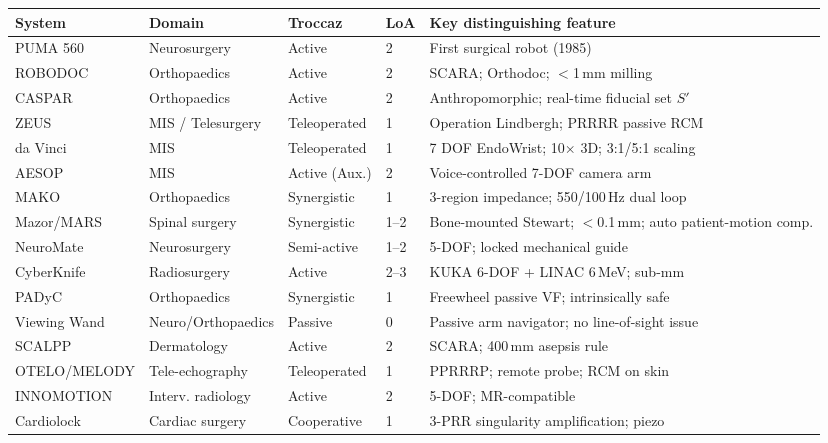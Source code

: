 \documentclass[11pt,a4paper,twoside]{report}
\begin{document}
\begin{table}[ht]
\centering\small
\begin{tabularx}{\textwidth}{@{}lXllX@{}}
\toprule
\textbf{System} & \textbf{Domain} & \textbf{Troccaz} & \textbf{LoA} & \textbf{Key distinguishing feature} \\
\midrule
PUMA 560        & Neurosurgery       & Active        & 2     & First surgical robot (1985) \\
ROBODOC         & Orthopaedics       & Active        & 2     & SCARA; Orthodoc; $<$1\,mm milling \\
CASPAR          & Orthopaedics       & Active        & 2     & Anthropomorphic; real-time fiducial set $S'$ \\
ZEUS            & MIS / Telesurgery  & Teleoperated  & 1     & Operation Lindbergh; PRRRR passive RCM \\
da Vinci        & MIS                & Teleoperated  & 1     & 7 DOF EndoWrist; 10$\times$ 3D; 3:1/5:1 scaling \\
AESOP           & MIS                & Active (Aux.) & 2     & Voice-controlled 7-DOF camera arm \\
MAKO            & Orthopaedics       & Synergistic   & 1     & 3-region impedance; 550/100\,Hz dual loop \\
Mazor/MARS      & Spinal surgery     & Synergistic   & 1--2  & Bone-mounted Stewart; $<$0.1\,mm; auto patient-motion comp. \\
NeuroMate       & Neurosurgery       & Semi-active   & 1--2  & 5-DOF; locked mechanical guide \\
CyberKnife      & Radiosurgery       & Active        & 2--3  & KUKA 6-DOF + LINAC 6\,MeV; sub-mm \\
PADyC           & Orthopaedics       & Synergistic   & 1     & Freewheel passive VF; intrinsically safe \\
Viewing Wand    & Neuro/Orthopaedics & Passive       & 0     & Passive arm navigator; no line-of-sight issue \\
SCALPP          & Dermatology        & Active        & 2     & SCARA; 400\,mm asepsis rule \\
OTELO/MELODY    & Tele-echography    & Teleoperated  & 1     & PPRRRP; remote probe; RCM on skin \\
INNOMOTION      & Interv. radiology  & Active        & 2     & 5-DOF; MR-compatible \\
Cardiolock      & Cardiac surgery    & Cooperative   & 1     & 3-PRR singularity amplification; piezo \\

\end{tabularx}
\end{table}
\end{document}
